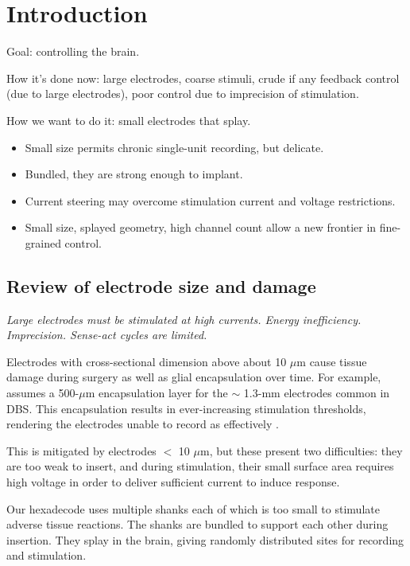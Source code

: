 \documentclass[10pt,letterpaper]{article}
\begin{document}
\linenumbers

\section{Introduction}

Goal: controlling the brain.

How it's done now: large electrodes, coarse stimuli, crude if any
feedback control (due to large electrodes), poor control due to
imprecision of stimulation.

How we want to do it: small electrodes that splay.
\begin{itemize}
\item Small size permits chronic single-unit recording, but delicate.
\item Bundled, they are strong enough to implant.
\item Current steering may overcome stimulation current and voltage restrictions.
\item Small size, splayed geometry, high channel count allow a new frontier in fine-grained control.
\end{itemize}


\subsection{Review of electrode size and damage}

{\em Large electrodes must be stimulated at high currents.  Energy inefficiency.  Imprecision.  Sense-act cycles are limited.}

Electrodes with cross-sectional dimension above about 10 $\mu$m cause tissue damage during surgery as well as glial encapsulation over time.  For example,  
\cite{Butson2008steering} assumes a 500-$\mu$m encapsulation layer for
the $\sim$ 1.3-mm electrodes common in DBS.   This encapsulation results in ever-increasing stimulation thresholds, rendering the electrodes unable to record as effectively
\cite{Barrese2016electrodestability,Biran2005gliosis,Polikov2005gliosis,Winslow2010gliosis}.

This is mitigated by
electrodes $<$ 10 $\mu$m, but these present two difficulties: they are
too weak to insert, and during stimulation, their small surface area
requires high voltage in order to deliver sufficient current to induce
response.

Our hexadecode \cite{Guitchounts2013electrode} uses multiple shanks
each of which is too small to stimulate adverse tissue reactions.  The
shanks are bundled to support each other during insertion.  They splay
in the brain, giving randomly distributed sites for recording and
stimulation.
\end{document}
